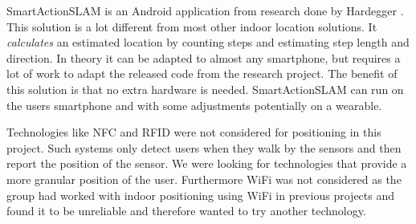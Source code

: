 SmartActionSLAM is an Android application from research done by Hardegger \etal \cite{SASLAM}. 
This solution is a lot different from most other indoor location solutions. 
It \emph{calculates} an estimated location by counting steps and estimating step length and direction. 
In theory it can be adapted to almost any smartphone, 
but requires a lot of work to adapt the released code from the research project. The benefit of this solution is that no extra hardware is needed. SmartActionSLAM can run on the users smartphone and with some adjustments potentially on a wearable.

Technologies like NFC and RFID were not considered for positioning in this project. Such systems only detect users when they walk by the sensors and then report the position of the sensor. We were looking for technologies that provide a more granular position of the user. Furthermore WiFi was not considered as the group had worked with indoor positioning using WiFi in previous projects and found it to be unreliable and therefore wanted to try another technology.




